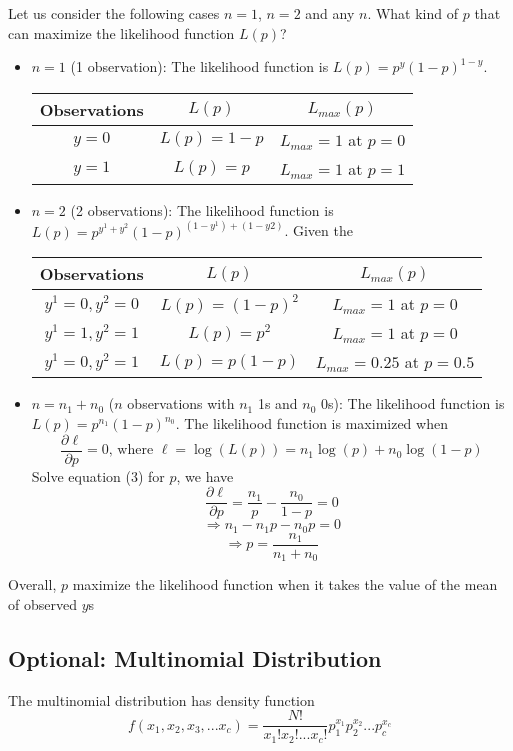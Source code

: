 \documentclass[12pt, oneside]{article}
\begin{document}
Let us consider the following cases $n=1$, $n=2$ and any $n$. What kind of $p$ that can maximize the likelihood function $L(p)$?
\begin{itemize}
\item $n=1$ (1 observation): The likelihood function is $L(p)=p^{y}(1-p)^{1-y}$. 
\begin{center}
\begin{tabular}{c|c|c} 
Observations & $L(p)$ &$ L_{max}(p)$\\
\hline
$y=0$ & $L(p)=1-p$ &$L_{max}=1$ at $p=0$\\
$y=1$ & $L(p)=p$     &$L_{max}=1$ at $p=1$\\
\end{tabular}
\end{center}
\item $n=2$ (2 observations): The likelihood function is $L(p)=p^{y^1+y^2}(1-p)^{(1-y^1)+(1-y2)}$. Given the 
\begin{center}
\begin{tabular}{c|c|c} 
Observations & $L(p)$ &$ L_{max}(p)$\\
\hline
$y^1=0, y^2=0$ & $L(p)=(1-p)^2$ &$L_{max}=1$ at $p=0$\\
$y^1=1, y^2=1$ & $L(p)=p^2$     &$L_{max}=1$ at $p=0$\\
$y^1=0, y^2=1$ & $L(p)=p(1-p)$  &$L_{max}=0.25$ at $p=0.5$
\end{tabular}
\end{center}
\item $n=n_1+n_0$ ($n$ observations with $n_1$ 1s and $n_0$ 0s): The likelihood function is $L(p)=p^{n_1}(1-p)^{n_0}$. The likelihood function is maximized when 
\begin{equation}
\frac{\partial \ell}{\partial p}=0 \text{, where }\ell=\log(L(p))=n_1 \log(p)+n_0 \log(1-p)
\end{equation}
Solve equation (3) for $p$, we have 
$$\frac{\partial \ell}{\partial p}=\frac{n_1}{p}-\frac{n_0}{1-p}=0$$
$$\Rightarrow n_1-n_1 p-n_0 p=0$$
$$\Rightarrow p=\frac{n_1}{n_1+n_0}$$
\end{itemize}

Overall, $p$ maximize the likelihood function when it takes the value of the mean of observed $y$s
\subsection{Optional: Multinomial Distribution}

The multinomial distribution has density function
$${f(x_1, x_2, x_3, ... x_c)=\frac{N!}{x_1! x_2! ... x_c!} p_1^{x_1} p_2^{x_2} ... p_c^{x_c}}$$
\end{document}
